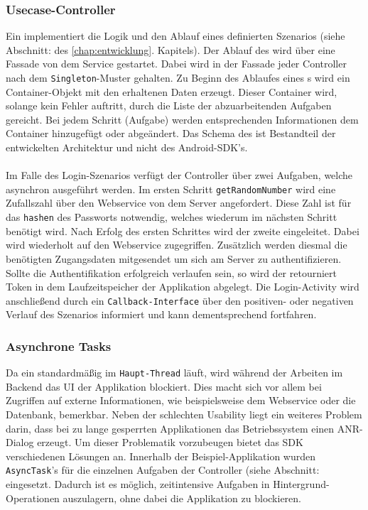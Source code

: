 \documentclass[Bachelorarbeit.tex]{subfiles}
\begin{document}
\subsubsection*{Usecase-Controller}
\label{subsub:android_uc-controller}
Ein  implementiert die Logik und den Ablauf eines definierten Szenarios (siehe Abschnitt:  des \ref{chap:entwicklung}. Kapitels). 
Der Ablauf des  wird über eine Fassade von dem Service gestartet.
Dabei wird in der Fassade jeder Controller nach dem \texttt{Singleton}-Muster gehalten. 
Zu Beginn des Ablaufes eines s wird ein Container-Objekt mit den erhaltenen Daten erzeugt. 
Dieser Container wird, solange kein Fehler auftritt, durch die Liste der abzuarbeitenden Aufgaben  gereicht.
Bei jedem Schritt (Aufgabe) werden entsprechenden Informationen dem Container hinzugefügt oder abgeändert.
Das Schema des  ist Bestandteil der entwickelten Architektur und nicht des Android-\ac{SDK}'s.\\
\\
Im Falle des Login-Szenarios verfügt der Controller über zwei Aufgaben, welche asynchron ausgeführt werden.
Im ersten Schritt \texttt{getRandomNumber} wird eine Zufallszahl über den Webservice von dem Server angefordert. 
Diese Zahl ist für das \texttt{hashen} des Passworts notwendig, welches wiederum im nächsten Schritt benötigt wird.
Nach Erfolg des ersten Schrittes wird der zweite eingeleitet.
Dabei wird wiederholt auf den Webservice zugegriffen. 
Zusätzlich werden diesmal die benötigten Zugangsdaten mitgesendet um sich am Server zu authentifizieren.
Sollte die Authentifikation erfolgreich verlaufen sein, so wird der  retourniert Token in dem Laufzeitspeicher der Applikation abgelegt.
Die Login-Activity wird anschließend durch ein \texttt{Callback-Interface} über den positiven- oder negativen Verlauf des Szenarios informiert und kann dementsprechend fortfahren. 

\subsubsection*{Asynchrone Tasks}
\label{subsub:android_async-task}

Da ein  standardmäßig im \texttt{Haupt-Thread} läuft, wird während der Arbeiten im Backend das \ac{UI} der Applikation blockiert.
Dies macht sich vor allem bei Zugriffen auf externe Informationen, wie beispielsweise dem Webservice oder die Datenbank, bemerkbar.
Neben der schlechten Usability liegt ein weiteres Problem darin, dass bei zu lange gesperrten Applikationen das Betriebssystem einen \ac{ANR}-Dialog erzeugt. \parencite[vgl.][]{android_responsive}
Um dieser Problematik vorzubeugen bietet das \ac{SDK} verschiedenen Lösungen an.
Innerhalb der Beispiel-Applikation wurden  \texttt{AsyncTask}'s für die einzelnen Aufgaben der Controller (siehe Abschnitt:  eingesetzt.
Dadurch ist es möglich, zeitintensive Aufgaben in Hintergrund-Operationen auszulagern, ohne dabei die Applikation zu blockieren.
\end{document}
